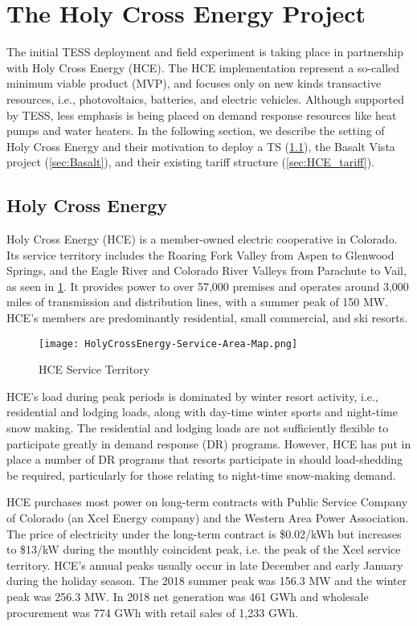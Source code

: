 \section{The Holy Cross Energy Project}\label{sec:hce}

The initial TESS deployment and field experiment is taking place in partnership with Holy Cross Energy (HCE). The HCE implementation represent a so-called minimum viable product (MVP), and focuses only on new kinds transactive resources, i.e., photovoltaics, batteries, and electric vehicles.  Although supported by TESS, less emphasis is being placed on demand response resources like heat pumps and water heaters.  
In the following section, we describe the setting of Holy Cross Energy and their motivation to deploy a TS (\cref{sec:HCE_description}), the Basalt Vista project (\cref{sec:Basalt}), and their existing tariff structure (\cref{sec:HCE_tariff}). 

\subsection{Holy Cross Energy}\label{sec:HCE_description}

Holy Cross Energy (HCE) is a member-owned electric cooperative in Colorado. Its service territory includes the Roaring Fork Valley from Aspen to Glenwood Springs, and the Eagle River and Colorado River Valleys from Parachute to Vail, as seen in \cref{fig:HCE_service_territory}. It provides power to over 57,000 premises and operates around 3,000 miles of transmission and distribution lines, with a summer peak of 150 MW. HCE's members are predominantly residential, small commercial, and ski resorts. 

\begin{figure}[t]
\centering
\texttt{[image: HolyCrossEnergy-Service-Area-Map.png]}
\caption{HCE Service Territory}
\label{fig:HCE_service_territory}
\end{figure}

HCE's load during peak periods is dominated by winter resort activity, i.e., residential and lodging loads, along with day-time winter sports and night-time snow making.  The residential and lodging loads are not sufficiently flexible to participate greatly in demand response (DR) programs. However, HCE has put in place a number of DR programs that resorts participate in should load-shedding be required, particularly for those relating to night-time snow-making demand.

HCE purchases most power on long-term contracts with Public Service Company of Colorado (an Xcel Energy company) and the Western Area Power Association. The price of electricity under the long-term contract is \$0.02/kWh but increases to \$13/kW during the monthly coincident peak, i.e. the peak of the Xcel service territory. HCE's annual peaks usually occur in late December and early January during the holiday season. The 2018 summer peak was 156.3 MW and the winter peak was 256.3 MW.  In 2018 net generation was 461 GWh and wholesale procurement was 774 GWh with retail sales of 1,233 GWh.

